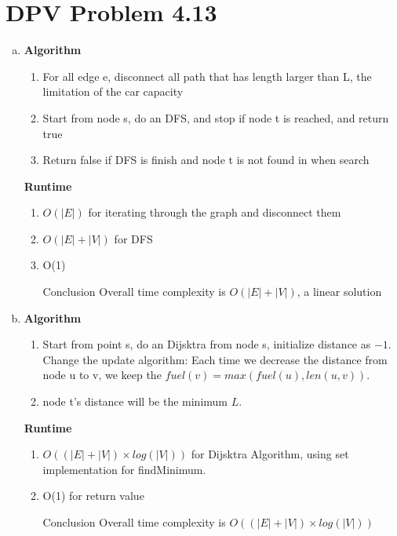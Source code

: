 \documentclass{article}
\begin{document}
\section{DPV Problem 4.13}
\begin{enumerate}[a)]
    \item 
        \textbf{Algorithm}
        \begin{enumerate}[Step 1]
            \item For all edge e, disconnect all path that has length larger than L, the limitation of the car capacity
            \item Start from node s, do an DFS, and stop if node t is reached, and return true
            \item Return false if DFS is finish and node t is not found in when search
        \end{enumerate}
        \textbf{Runtime}
        \begin{enumerate}[Step 1]
            \item $O(|E|)$ for iterating through the graph and disconnect them
            \item $O(|E| + |V|)$ for DFS
            \item O(1)
            \item [Conclusion] Overall time complexity is $O(|E| + |V|)$, a linear solution
        \end{enumerate}
    \item 
        \textbf{Algorithm} 
        \begin{enumerate}[Step 1]
             \item Start from point s, do an Dijsktra from node s, initialize distance as $-1$. \\
             Change the update algorithm: Each time we decrease the distance from node u to v, we keep the $fuel(v) = max(fuel(u), len(u, v))$.
             \item node t's distance will be the minimum $L$.
        \end{enumerate}
        \textbf{Runtime}
        \begin{enumerate}[Step 1]
            \item $O((|E| + |V|) \times log(|V|))$ for Dijsktra Algorithm, using set implementation for findMinimum.
            \item O(1) for return value
            \item [Conclusion] Overall time complexity is $O((|E| + |V|) \times log(|V|))$
        \end{enumerate}
\end{enumerate}
\end{document}
